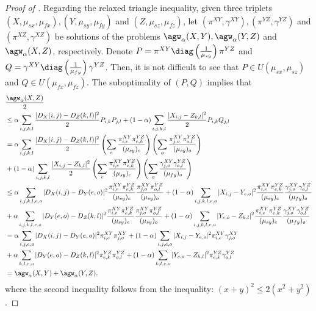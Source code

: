 \begin{proof}[Proof of ]
  Regarding the relaxed triangle inequality, given three triplets
  $(X, \mu_{sx}, \mu_{fx}), (Y, \mu_{sy}, \mu_{fy})$ and $(Z, \mu_{sz}, \mu_{fz})$,
  let $(\pi^{XY}, \gamma^{XY}), (\pi^{YZ}, \gamma^{YZ})$ and $(\pi^{XZ}, \gamma^{XZ})$
  be solutions of the problems $\agw_{\alpha}(X, Y), \agw_{\alpha}(Y, Z)$ and
  $\agw_{\alpha}(X, Z)$, respectively. Denote
  $P = \pi^{XY} \diag \left( \frac{1}{\mu_{sy}} \right) \pi^{YZ}$ and
  $Q = \gamma^{XY} \diag\left( \frac{1}{\mu_{fy}} \right) \gamma^{YZ}$. Then,
  it is not difficult to see that $P \in U(\mu_{sx}, \mu_{sz})$ and
  $Q \in U(\mu_{fx}, \mu_{fz})$. The suboptimality of $(P,Q)$ implies that
  \begin{align}
      &\frac{\agw_{\alpha}(X, Z)}{2} \\
      &\leq \alpha \sum_{i,j,k,l} \frac{|D_X(i,j) - D_Z(k,l)|^2}{2} P_{i,k} P_{j, l}
      + (1 - \alpha) \sum_{i,j,k,l} \frac{|X_{i,j} - Z_{k,l}|^2}{2} P_{i,k} Q_{j,l} \\
      &= \alpha \sum_{i,j,k,l} \frac{|D_X(i,j) - D_Z(k,l)|^2}{2}
      \left( \sum_e \frac{\pi^{XY}_{i,e} \pi^{YZ}_{e,k}}{(\mu_{sy})_e} \right)
      \left(\sum_o \frac{\pi^{XY}_{j,o} \pi^{YZ}_{o,l}}{(\mu_{sy})_o} \right) \\
      &+ (1 - \alpha) \sum_{i,j,k,l} \frac{|X_{i,j} - Z_{k,l}|^2}{2}
      \left(\sum_e \frac{\pi^{XY}_{i,e} \pi^{YZ}_{e,k}}{(\mu_{sy})_e} \right)
      \left( \sum_o \frac{\gamma^{XY}_{j,o} \gamma^{YZ}_{o,l}}{(\mu_{fy})_o} \right) \\
      &\leq \alpha \sum_{i,j,k,l,e,o} |D_X(i,j) - D_Y(e,o)|^2
      \frac{\pi^{XY}_{i,e} \pi^{YZ}_{e,k}}{(\mu_{sy})_e}
      \frac{\pi^{XY}_{j,o} \pi^{YZ}_{o,l}}{(\mu_{sy})_o}
      + (1 - \alpha) \sum_{i,j,k,l,e,o} |X_{i,j} - Y_{e,o}|^2
      \frac{\pi^{XY}_{i,e} \pi^{YZ}_{e,k}}{(\mu_{sy})_e}
      \frac{\gamma^{XY}_{j,o} \gamma^{YZ}_{o,l}}{(\mu_{fy})_o} \\
      &+ \alpha \sum_{i,j,k,l,e,o} |D_Y(e, o) - D_Z(k,l)|^2
      \frac{\pi^{XY}_{i,e} \pi^{YZ}_{e,k}}{(\mu_{sy})_e}
      \frac{\pi^{XY}_{j,o} \pi^{YZ}_{o,l}}{(\mu_{sy})_o}
      + (1 - \alpha) \sum_{i,j,k,l,e,o} |Y_{e, o} - Z_{k,l}|^2
      \frac{\pi^{XY}_{i,e} \pi^{YZ}_{e,k}}{(\mu_{sy})_e}
      \frac{\gamma^{XY}_{j,o} \gamma^{YZ}_{o,l}}{(\mu_{fy})_o} \\
      &= \alpha \sum_{i,j,e,o} |D_X(i,j) - D_Y(e,o)|^2 \pi^{XY}_{i,e} \pi^{XY}_{j,o}
      + (1 - \alpha) \sum_{i,j,e,o} |X_{i,j} - Y_{e,o}|^2 \pi^{XY}_{i,e} \gamma^{XY}_{j,o} \\
      &+ \alpha \sum_{k, l, e, o} |D_Y(e, o) - D_Z(k,l)|^2 \pi^{YZ}_{e,k} \pi^{YZ}_{o,l}
      + (1 - \alpha) \sum_{k,l,e,o} |Y_{e, o} - Z_{k,l}|^2 \pi^{YZ}_{e,k} \gamma^{YZ}_{o,l} \\
      &= \agw_{\alpha}(X, Y) + \agw_{\alpha}(Y, Z).
  \end{align}
  where the second inequality follows from the inequality: $(x + y)^2 \leq 2(x^2 + y^2)$.
\end{proof}


